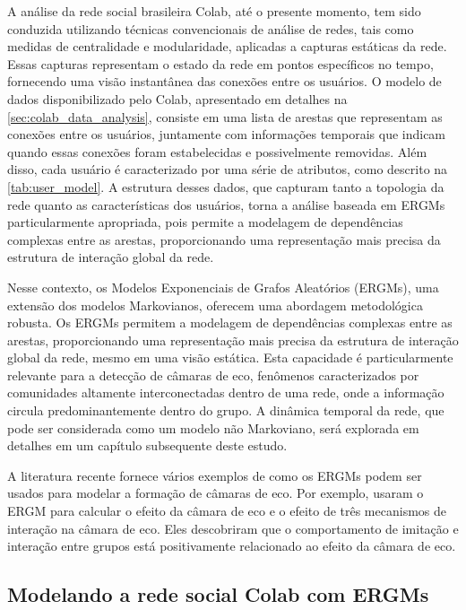 A análise da rede social brasileira Colab, até o presente momento, tem sido conduzida utilizando técnicas convencionais de análise de redes, tais como medidas de centralidade e modularidade, aplicadas a capturas estáticas da rede. Essas capturas representam o estado da rede em pontos específicos no tempo, fornecendo uma visão instantânea das conexões entre os usuários. O modelo de dados disponibilizado pelo Colab, apresentado em detalhes na \autoref{sec:colab_data_analysis}, consiste em uma lista de arestas que representam as conexões entre os usuários, juntamente com informações temporais que indicam quando essas conexões foram estabelecidas e possivelmente removidas. Além disso, cada usuário é caracterizado por uma série de atributos, como descrito na \autoref{tab:user_model}. A estrutura desses dados, que capturam tanto a topologia da rede quanto as características dos usuários, torna a análise baseada em ERGMs particularmente apropriada, pois permite a modelagem de dependências complexas entre as arestas, proporcionando uma representação mais precisa da estrutura de interação global da rede.

Nesse contexto, os Modelos Exponenciais de Grafos Aleatórios (ERGMs), uma extensão dos modelos Markovianos, oferecem uma abordagem metodológica robusta. Os ERGMs permitem a modelagem de dependências complexas entre as arestas, proporcionando uma representação mais precisa da estrutura de interação global da rede, mesmo em uma visão estática. Esta capacidade é particularmente relevante para a detecção de câmaras de eco, fenômenos caracterizados por comunidades altamente interconectadas dentro de uma rede, onde a informação circula predominantemente dentro do grupo. A dinâmica temporal da rede, que pode ser considerada como um modelo não Markoviano, será explorada em detalhes em um capítulo subsequente deste estudo.

A literatura recente fornece vários exemplos de como os ERGMs podem ser usados para modelar a formação de câmaras de eco. Por exemplo,  usaram o ERGM para calcular o efeito da câmara de eco e o efeito de três mecanismos de interação na câmara de eco. Eles descobriram que o comportamento de imitação e interação entre grupos está positivamente relacionado ao efeito da câmara de eco.

\subsection{Modelando a rede social Colab com ERGMs}

